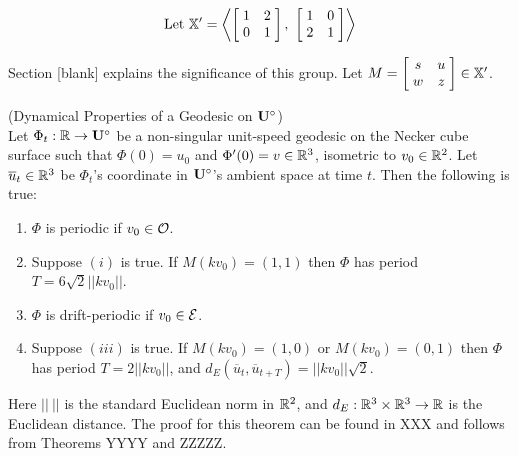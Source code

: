 \documentclass[]{article}
\def\<{\langle} \def\>{\rangle}
\begin{document}
\begin{align}
\text{Let }\XX'=\left\< \left[ \hspace{1mm} \begin{matrix}
							1 & 2\\
							 0 & 1
						\end{matrix}\hspace{1mm}\right],~
\left[ \hspace{1mm} \begin{matrix}
							1 & 0\\
							 2 & 1
						\end{matrix}\hspace{1mm}\right]\right\>
\end{align}

\noindent Section [blank] explains the significance of this group. Let $M=\left[ \hspace{1mm} \begin{matrix}
							s & u\\
							 w & z
						\end{matrix}\hspace{1mm}\right]\in\mathbb{X}'$.


\begin{thm*}
(Dynamical Properties of a Geodesic on $\mathbf{U}^\circ$) \\Let $\Phi_t:\mathbb{R}\rightarrow\mathbf{U}^\circ$ be a non-singular unit-speed geodesic on the Necker cube surface such that $\Phi(0)=u_0$ and $\Phi'(0)=v\in\mathbb{R}^3$, isometric to $v_0\in\mathbb{R}^2$. Let $\overline{u}_t\in\mathbb{R}^3$ be $\Phi_t$'s coordinate in $\mathbf{U}^\circ$'s ambient space at time $t$. Then the following is true:
\begin{enumerate}[label=(\roman*)]
\item $\Phi$ is periodic if $v_0\in\mathcal{O}$.
\item Suppose $(i)$ is true. If $M (kv_0)=(1,1)$ then $\Phi$ has period $T=6\sqrt{2}||kv_0||$.
\item $\Phi$ is drift-periodic if $v_0\in\mathcal{E}$. 
\item Suppose $(iii)$ is true. If $M (kv_0)=(1,0)$ or $M (kv_0)=(0,1)$ then $\Phi$ has period $T=2||kv_0||$, and $d_E(\overline{u}_t,\overline{u}_{t+T})=||kv_0||\sqrt{2}$.
\end{enumerate}
\end{thm*}

Here $||~||$ is the standard Euclidean norm in $\mathbb{R}^2$, and $d_E:\mathbb{R}^3\times\mathbb{R}^3\rightarrow\mathbb{R}$ is the Euclidean distance. The proof for this theorem can be found in XXX and follows from Theorems YYYY and ZZZZZ.
\end{document}
